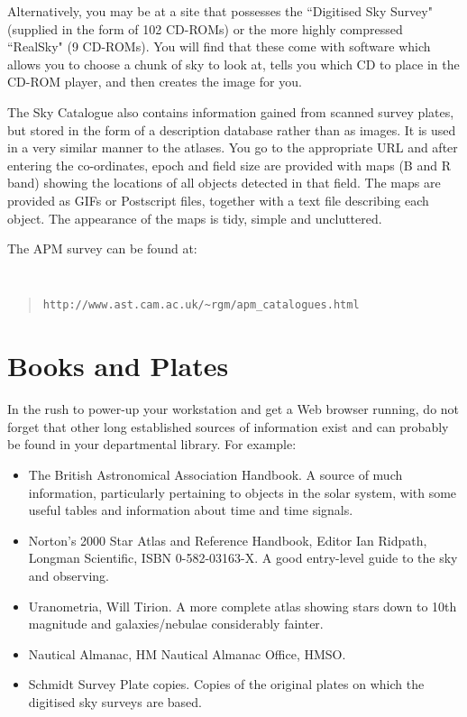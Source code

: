 Alternatively, you may be at a site that possesses the ``Digitised 
Sky Survey" (supplied in the form of 102 CD-ROMs) or the more highly compressed
``RealSky" (9 CD-ROMs). You will find that these come with software which
allows you to choose a chunk of sky to look at, tells you which CD to place in 
the CD-ROM player, and then creates the image for you.

The {\APMref} Sky Catalogue also contains information gained from scanned survey plates, but
stored in the form of a description database rather than as images. It is used in a very similar manner to the atlases.
You go to the appropriate URL and after entering the co-ordinates, epoch and field size
are provided with maps (B and R band) showing the locations of all objects detected in that field.
The maps are provided as GIFs or Postscript files, together with a text file describing each object.
The appearance of the maps is tidy, simple and uncluttered.

The APM survey can be found at:

{\tt
\begin{quote}
\begin{verbatim}
http://www.ast.cam.ac.uk/~rgm/apm_catalogues.html
\end{verbatim}
\end{quote}
}

\section{Books and Plates} 
\label{sec:books}

In the rush to power-up your workstation and get a Web browser
running, do not forget that other long established sources of information
exist and can probably be found in your departmental library. 
For example:

\begin{itemize}
\item The British Astronomical Association Handbook.
A source of much information,
particularly pertaining to objects in the solar system, with some useful tables and
information about time and time signals.
\item Norton's 2000 Star Atlas and Reference Handbook, Editor Ian Ridpath, Longman Scientific,
ISBN 0-582-03163-X. A good entry-level guide to the sky and observing. 
\item Uranometria, Will Tirion. A more complete atlas showing stars down to 10th
magnitude and galaxies/nebulae considerably fainter.
\item Nautical Almanac, HM Nautical Almanac Office, HMSO.
\item Schmidt Survey Plate copies. Copies of the original plates on which
the digitised sky surveys are based.
\end{itemize}



